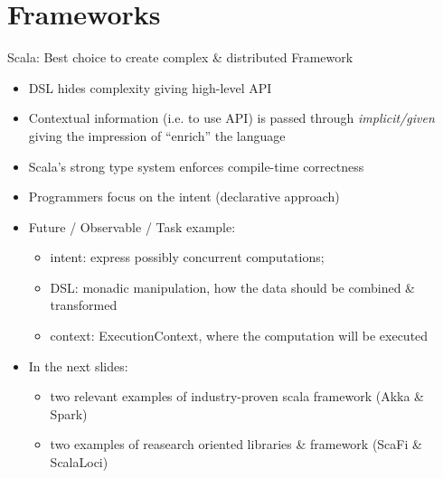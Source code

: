 \documentclass[presentation, 9pt]{beamer}\mode<presentation>{\usetheme{AMSBolognaFC}}
\begin{document}
\section{Frameworks}
\begin{frame}{Scala: Best choice to create complex \& distributed Framework}
	\begin{itemize}
		\item DSL hides complexity giving high-level API
  	\item Contextual information (i.e. to use API) is passed through \emph{implicit/given} giving the impression of ``enrich'' the language
   \item Scala's strong type system enforces compile-time correctness
   \item Programmers focus on the intent (declarative approach)
   \item Future / Observable / Task example:
   \begin{itemize}
			\item intent: express possibly concurrent computations;
   		\item DSL: monadic manipulation, how the data should be combined \& transformed
     \item context: ExecutionContext, where the computation will be executed 
	 \end{itemize}
	 \item In the next slides:
	 \begin{itemize}
			\item two relevant examples of industry-proven scala framework (Akka \& Spark)
   	\	\item two examples of reasearch oriented libraries \& framework (ScaFi \& ScalaLoci) 
	 \end{itemize}
	\end{itemize}
\end{frame}
\end{document}

